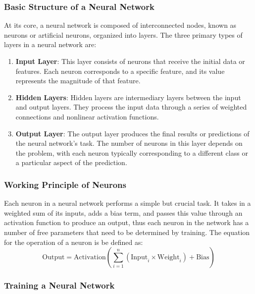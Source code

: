 \subsubsection{Basic Structure of a Neural Network}

At its core, a neural network is composed of interconnected nodes, known as neurons or artificial neurons, organized into layers. The three primary types of layers in a neural network are:

\begin{enumerate}
	\item \textbf{Input Layer}: This layer consists of neurons that receive the initial data or features. Each neuron corresponds to a specific feature, and its value represents the magnitude of that feature.
	
	\item \textbf{Hidden Layers}: Hidden layers are intermediary layers between the input and output layers. They process the input data through a series of weighted connections and nonlinear activation functions.
	
	\item \textbf{Output Layer}: The output layer produces the final results or predictions of the neural network's task. The number of neurons in this layer depends on the problem, with each neuron typically corresponding to a different class or a particular aspect of the prediction.
\end{enumerate}

\subsubsection{Working Principle of Neurons}

Each neuron in a neural network performs a simple but crucial task. It takes in a weighted sum of its inputs, adds a bias term, and passes this value through an activation function to produce an output, thus each neuron in the network has a number of free parameters that need to be determined by training. The equation for the operation of a neuron is be defined as:
\begin{equation}
	\text{Output} = \text{Activation}\left(\sum_{i=1}^{n} (\text{Input}_i \times \text{Weight}_i) + \text{Bias}\right)
\end{equation}

\subsubsection{Training a Neural Network}

